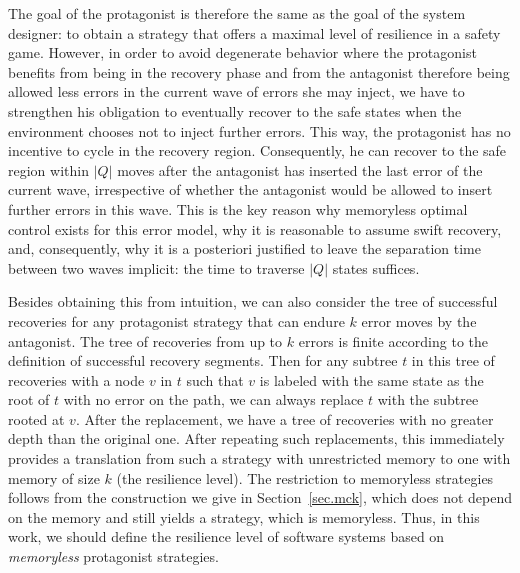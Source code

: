 The goal of the protagonist is therefore the same as the goal of the system designer: to obtain a strategy that offers a maximal level of resilience in a safety game. 
\label{reply1.memoryless.unbounded.resilience} 
However, in order to avoid degenerate behavior where the protagonist benefits from being in the recovery phase and from the antagonist therefore being allowed less errors in the current wave of errors she may inject, we have to strengthen his obligation to eventually recover to the safe states when the environment chooses not to inject further errors.
This way, the protagonist has no incentive to cycle in the recovery region.
Consequently, he can recover to the safe region within $|Q|$ moves after the antagonist has inserted the last error of the current wave, irrespective of whether the antagonist would be allowed to insert further errors in this wave.
This is the key reason why memoryless optimal control exists for this error model, why it is reasonable to assume swift recovery, and, consequently, why it is a posteriori justified to leave the separation time between two waves implicit: the time to traverse $|Q|$ states suffices.



Besides obtaining this from intuition, we can also consider the tree of successful recoveries for any protagonist strategy that can endure $k$ error moves by the antagonist.
The tree of recoveries from up to $k$ errors is finite according to 
the definition of successful recovery segments. 
Then for any subtree $t$ in this tree of recoveries with a node $v$ in $t$ 
such that $v$ is labeled with the same state as the root of $t$ with no error on the path,   
we can always replace $t$ with the subtree rooted at $v$.  
After the replacement, we have a tree of recoveries with no greater depth than 
the original one. 
After repeating such replacements, 
this immediately provides a translation from such a strategy with unrestricted memory 
to one with memory of size $k$ (the resilience level).
The restriction to memoryless strategies follows from the construction we give 
in Section~\ref{sec.mck}, 
which does not depend on the memory and still yields a strategy, which is memoryless.
Thus, in this work, we should define the resilience level of software systems based 
on \emph{memoryless} protagonist strategies.  

